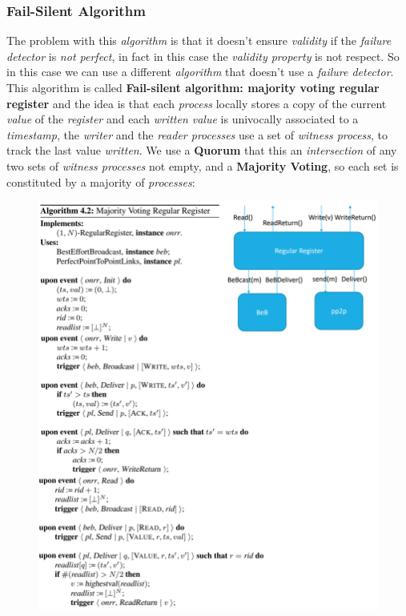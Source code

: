 \documentclass{article}
\begin{document}
\subsubsection{Fail-Silent Algorithm} 
The problem with this \emph{algorithm} is that it doesn't ensure \emph{validity} if the \emph{failure detector} is \emph{not perfect}, in fact in this case the \emph{validity property} is not respect. So in this case we can use a different \emph{algorithm} that doesn't use a \emph{failure detector}. This algorithm is called \textbf{Fail-silent algorithm: majority voting regular register} and the idea is that each \emph{process} locally stores a copy of the current \emph{value} of the \emph{register} and each \emph{written value} is univocally associated to a \emph{timestamp}, the \emph{writer} and the \emph{reader processes} use a set of \emph{witness process}, to track the last value \emph{written}. We use a \textbf{Quorum} that this an \emph{intersection} of any two sets of \emph{witness processes} not empty, and a \textbf{Majority Voting}, so each set is constituted by a majority of \emph{processes}:
\begin{figure}[H]
  \centering
  \includegraphics[scale=0.95,left]{cattura69.png}
\end{figure}
\end{document}
